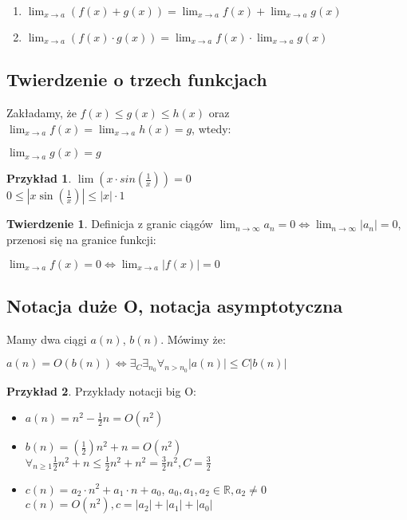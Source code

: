 \documentclass{article}
\theoremstyle{definition}
\theoremstyle{definition}
\newtheorem{tw}{Twierdzenie}[subsection]
\theoremstyle{definition}
\newtheorem{pk}{Przykład}[subsection]
\theoremstyle{definition}
\begin{document}
\begin{enumerate}
    \item $\lim_{x\rightarrow a} (f(x)+g(x))=\lim_{x\rightarrow a} f(x) + \lim_{x\rightarrow a} g(x)$
    \item $\lim_{x\rightarrow a} (f(x)\cdot g(x))=\lim_{x\rightarrow a} f(x) \cdot \lim_{x\rightarrow a} g(x)$
\end{enumerate}

\subsection{Twierdzenie o trzech funkcjach}
Zakładamy, że $f(x)\leq g(x)\leq h(x)$ oraz $\lim_{x\rightarrow a} f(x) = \lim_{x\rightarrow a} h(x) = g$, wtedy:
\begin{center}
    $\lim_{x\rightarrow a} g(x) = g$
\end{center}

\begin{pk}
    $\lim \left(x\cdot sin\left(\frac{1}{x}\right)\right)=0$\\
    $0\leq |x\sin\left(\frac{1}{x}\right)|\leq|x|\cdot 1$
\end{pk}

\begin{tw}
Definicja z granic ciągów $\lim_{n\rightarrow \infty} a_n = 0 \iff \lim_{n\rightarrow \infty} |a_n| = 0$,
przenosi się na granice funkcji:
\begin{center}
    $\lim_{x\rightarrow a} f(x) = 0 \iff \lim_{x\rightarrow a} |f(x)| = 0$
\end{center}
\end{tw}

\subsection{Notacja duże O, notacja asymptotyczna}

Mamy dwa ciągi $a(n)$, $b(n)$. Mówimy że:
\begin{center}
     $a(n)=O\left(b\left(n\right)\right)\iff \exists_C \exists_{n_0} \forall_{n>n_0} \left|a(n)\right|\leq C\left|b(n)\right|$
\end{center}

\begin{pk}
    Przykłady notacji big O:\\
    \begin{itemize}
        \item $a(n)=n^2 - \frac{1}{2} n = O(n^2)$
        \item $b(n)=\left(\frac{1}{2}\right) n^2 + n = O(n^2)$\\
        $\forall_{n\geq 1} \frac{1}{2} n^2 + n \leq \frac{1}{2} n^2 + n^2 = \frac{3}{2} n^2, C=\frac{3}{2}$
        \item $c(n)=a_2\cdot n^2 + a_1\cdot n + a_0$, $a_0,a_1,a_2 \in \mathbb{R}, a_2\neq 0$\\
        $c(n)=O(n^2), c=|a_2|+|a_1|+|a_0|$   
    \end{itemize}
\end{pk}
\end{document}
